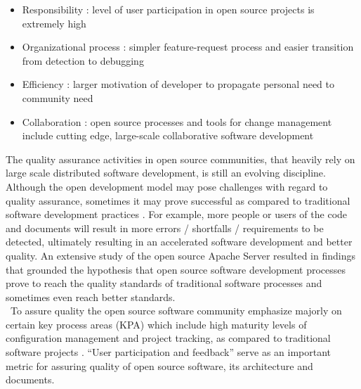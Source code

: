 \begin{itemize}
\item Responsibility : level of user participation in open source projects is extremely high
\item Organizational process : simpler feature-request process and easier transition from detection to debugging 
\item Efficiency : larger motivation of developer to propagate personal need to community need
\item Collaboration : open source processes and tools for change management include cutting edge, large-scale collaborative software development
\end{itemize}
\indent The quality assurance activities in open source communities, that heavily rely on large scale distributed software development, is still an evolving discipline. Although the open development model may pose challenges with regard to quality assurance, sometimes it may prove successful as compared to traditional software development practices \cite{Zhao2003}. For example, more people or users of the code and documents will result in more errors / shortfalls / requirements to be detected, ultimately resulting in an accelerated software development and better quality. An extensive study of the open source Apache Server \cite{Mockus2000} resulted in findings that grounded the hypothesis that open source software development processes prove to reach the quality standards of traditional software processes and sometimes even reach better standards.
\\\ To assure quality the open source software community emphasize majorly on certain key process areas (KPA) which include high maturity levels of configuration management and project tracking, as compared to traditional software projects \cite{Zhao2003}. \enquote{User participation and feedback} serve as an important metric for assuring quality of open source software, its architecture and documents. 

